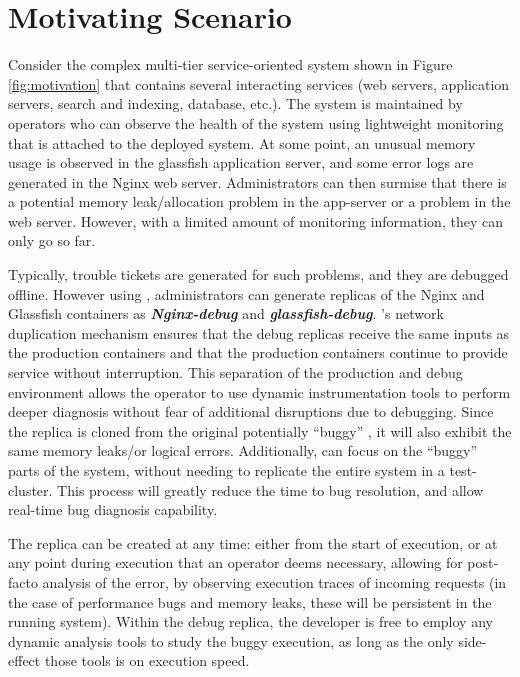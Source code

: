 
\section{Motivating Scenario}
\label{sec:motivation}

Consider the complex multi-tier service-oriented system shown in Figure \ref{fig:motivation} that contains several interacting services (web servers, application servers, search and indexing, database, etc.). 
The system is maintained by operators who can observe the health of the system using lightweight monitoring that is attached to the deployed system.
At some point, an unusual memory usage is observed in the glassfish application server, and some error logs are generated in the Nginx web server. 
Administrators can then surmise that there is a potential memory leak/allocation problem in the app-server or a problem in the web server.
However, with a limited amount of monitoring information, they can only go so far.


Typically, trouble tickets are generated for such problems, and they are debugged offline.
However using \parikshan, administrators can generate replicas of the Nginx and Glassfish containers as \textbf{\textit{Nginx-debug}} and \textbf{\textit{glassfish-debug}}.
\parikshan's network duplication mechanism ensures that the debug replicas receive the same inputs as the production containers and that the production containers continue to provide service without interruption.
This separation of the production and debug environment allows the operator to use dynamic instrumentation tools to perform deeper diagnosis without fear of additional disruptions due to debugging.
Since the replica is cloned from the original potentially ``buggy'' \productioncontainer, it will also exhibit the same memory leaks/or logical errors.
Additionally, \parikshan can focus on the ``buggy'' parts of the system, without needing to replicate the entire system in a test-cluster.
This process will greatly reduce the time to bug resolution, and allow real-time bug diagnosis capability.

The replica can be created at any time: either from the start of execution, or at any point during execution that an operator deems necessary, allowing for post-facto analysis of the error, by observing execution traces of incoming requests (in the case of performance bugs and memory leaks, these will be persistent in the running system).
Within the debug replica, the developer is free to employ any dynamic analysis tools to study the buggy execution, as long as the only side-effect those tools is on execution speed.

